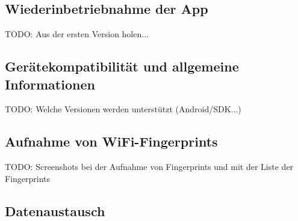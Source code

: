 \subsection{Wiederinbetriebnahme der App}

TODO: Aus der ersten Version holen...

\subsection{Gerätekompatibilität und allgemeine Informationen}

TODO: Welche Versionen werden unterstützt (Android/SDK...)

\subsection{Aufnahme von WiFi-Fingerprints}

TODO: Screenshots bei der Aufnahme von Fingerprints und mit der Liste der Fingerprints

\subsection{Datenaustausch}

